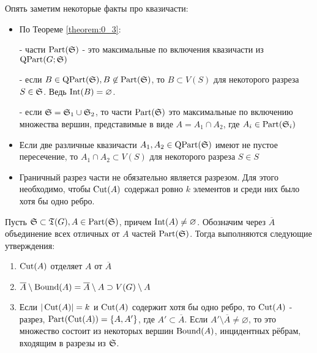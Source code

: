 Опять заметим некоторые факты про квазичасти:

\begin{itemize}
	\item По Теореме \ref{theorem:0_3}:

		- части $\Part(\S)$ - это максимальные по включения квазичасти из  $\QPart(G; \S)$

		- если  $B \in \QPart(\S), B \not \in \Part(\S)$, то $B \subset V(S)$ для некоторого разреза  $S \in \S$. Ведь $\Int(B) = \varnothing$.

		- если  $\S = \S_1 \cup \S_2$, то части  $\Part(\S)$ это максимальные по включению множества вершин, представимые в виде  $A = A_1 \cap A_2$, где $A_i \in \Part(\S_i)$
	
	\item Если две различные квазичасти $A_1, A_2 \in \QPart(\S)$ имеют не пустое пересечение, то $A_1 \cap A_2 \subset V(S)$ для некоторого разреза $S \in S$
	
	\item Граничный разрез части не обязательно является разрезом.
		Для этого необходимо, чтобы  $\Cut(A)$ содержал ровно  $k$ элементов и среди них было хотя бы одно ребро.
\end{itemize}

\begin{customlm}{0.6} \label{lemma:0_6}
	Пусть $\S \subset \T(G), A \in \Part(\S)$, причем  $\Int(A) \neq \varnothing$.
	Обозначим через  $\overline A$ объединение всех отличных от  $A$ частей  $\Part(\S)$.
	Тогда выполняются следующие утверждения:

	\begin{enumerate}
		\item $\Cut(A)$ отделяет  $A$ от  $\overline A$
		\item  $\overline A \setminus \Bound(A) = \overline A \setminus A \supset V(G) \setminus A$
		\item Если  $|\Cut(A)| = k$ и  $\Cut(A)$ содержит хотя бы одно ребро, то  $\Cut(A)$ - разрез,  $\Part(\Cut(A)) = \{A, A'\}$, где $A' \subset \overline A$.
			Если  $A' \setminus \overline A \neq \varnothing$, то это множество состоит из некоторых вершин  $\Bound(A)$, инцидентных рёбрам, входящим в разрезы из  $\S$.
	\end{enumerate}

\end{customlm}

